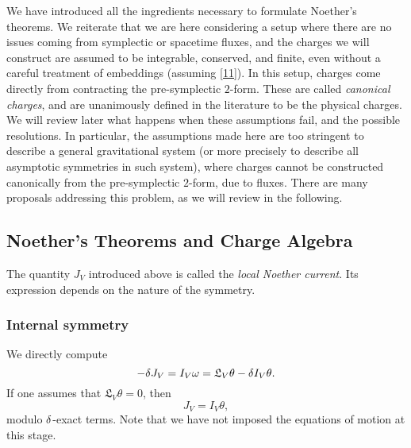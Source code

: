  
We have introduced all the ingredients necessary to formulate Noether's theorems. We reiterate that we are here considering a setup where there are no issues coming from symplectic or spacetime fluxes, and the charges we will construct are assumed to be integrable, conserved, and finite, even without a careful treatment of embeddings (assuming \eqref{11}). In this setup, charges come directly from contracting the pre-symplectic $2$-form. These are called \textit{canonical charges}, and are unanimously defined in the literature to be the physical charges. We will review later what happens when these assumptions fail, and the possible resolutions. In particular, the assumptions made here are too stringent to describe a general gravitational system (or more precisely to describe all asymptotic symmetries in such system), where charges cannot be constructed canonically from the pre-symplectic $2$-form, due to fluxes. There are many proposals addressing this problem, as we will review in the following.

\subsection{Noether's Theorems and Charge Algebra}
The quantity $J_V$ introduced above is called the \textit{local Noether current}. Its expression depends on the nature of the symmetry.

\subsubsection*{Internal symmetry} We directly compute
\begin{equation}\label{13}
	-\delta J_V=I_V\omega=\mathfrak{L}_V\theta-\delta I_V\theta.
\end{equation}
If one assumes that $\mathfrak{L}_V\theta=0$, then
\begin{equation}\label{14}
	J_V=I_V\theta,
\end{equation}
modulo $\delta$-exact terms. Note that we have not imposed the equations of motion at this stage.

